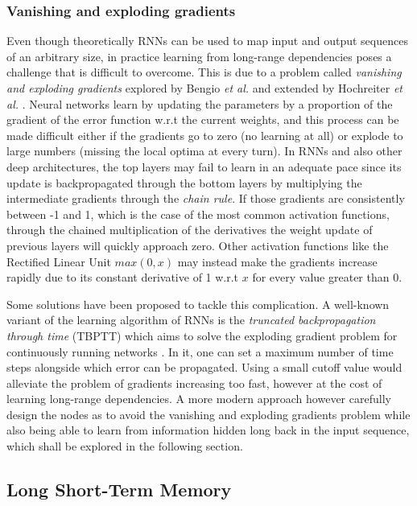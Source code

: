 \documentclass{kththesis}
\begin{document}
\subsubsection{Vanishing and exploding gradients}

Even though theoretically RNNs can be used to map input and output sequences of an arbitrary size, in practice learning from long-range dependencies poses a challenge that is difficult to overcome. This is due to a problem called \emph{vanishing and exploding gradients} explored by Bengio \emph{et al.} \citep{bengio1994learning} and extended by Hochreiter \emph{et al.} \citep{hochreiter2001gradient}. Neural networks learn by updating the parameters by a proportion of the gradient of the error function w.r.t the current weights, and this process can be made difficult either if the gradients go to zero (no learning at all) or explode to large numbers (missing the local optima at every turn). In RNNs and also other deep architectures, the top layers may fail to learn in an adequate pace since its update is backpropagated through the bottom layers by multiplying the intermediate gradients through the \emph{chain rule}. If those gradients are consistently between -1 and 1, which is the case of the most common activation functions, through the chained multiplication of the derivatives the weight update of previous layers will quickly approach zero. Other activation functions like the Rectified Linear Unit $max(0,x)$ may instead make the gradients increase rapidly due to its constant derivative of 1 w.r.t $x$ for every value greater than 0.

Some solutions have been proposed to tackle this complication. A well-known variant of the learning algorithm of RNNs is the \emph{truncated backpropagation through time} (TBPTT) which aims to solve the exploding gradient problem for continuously running networks \citep{williams1989learning}. In it, one can set a maximum number of time steps alongside which error can be propagated. Using a small cutoff value would alleviate the problem of gradients increasing too fast, however at the cost of learning long-range dependencies. A more modern approach however carefully design the nodes as to avoid the vanishing and exploding gradients problem while also being able to learn from information hidden long back in the input sequence, which shall be explored in the following section.

\subsection{Long Short-Term Memory}
\end{document}
